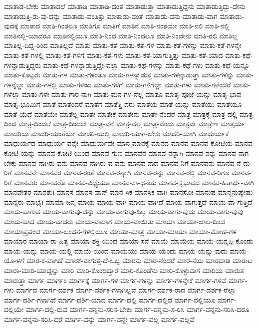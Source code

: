 {ಮಾತಾಡ-ಬೇಕು
ಮಾತಾಡಲೆ
ಮಾತಾಡಿ
ಮಾತಾಡಿ-ದಂತೆ
ಮಾತಾಡುತ್ತಾ
ಮಾತಾಡುತ್ತಿದ್ದನು
ಮಾತಾಡುತ್ತಿದ್ದು-ದೇನು
ಮಾತಾಡುತ್ತಿ-ರು-ವು-ದನ್ನು
ಮಾತಾಡು-ವಂತಿತ್ತು
ಮಾತಾಡು-ವಂತೆ
ಮಾತಾಡು-ವನು
ಮಾತಾಡು-ವಾಗ
ಮಾತಾಡು-ವುದಕ್ಕೆ
ಮಾತಾದ
ಮಾತಿ-ಗಿಂತಲೂ
ಮಾತಿಗೂ
ಮಾತಿಗೆ
ಮಾತಿನ
ಮಾತಿ-ನಂತೆಯೇ
ಮಾತಿ-ನಲಿ
ಮಾತಿ-ನಲ್ಲಿ
ಮಾತಿನಲ್ಲಿ-ಯಾದರೂ
ಮಾತಿನಲ್ಲಿಯೂ
ಮಾತಿ-ನಿಂದ
ಮಾತಿ-ನಿಂದಲೂ
ಮಾತಿ-ನಿಂದೇನು
ಮಾತಿ-ರಲಿ
ಮಾತಿಲ್ಲ
ಮಾತಿಲ್ಲ-ದಿದ್ದ-ರಿಂದ
ಮಾತಿಲ್ಲದೆ
ಮಾತು
ಮಾತು-ಕತೆ
ಮಾತು-ಕತೆ-ಗಳ
ಮಾತು-ಕತೆ-ಗಳನ್ನು
ಮಾತು-ಕತೆ-ಗಳನ್ನೇ
ಮಾತು-ಕತೆ-ಗಳಲ್ಲಿ
ಮಾತು-ಕತೆ-ಗಳಿಗೆ
ಮಾತು-ಕತೆ-ಗಳು
ಮಾತು-ಕತೆ-ಯಾಗುತ್ತಿತ್ತು
ಮಾತು-ಕತೆ-ಯಾದ
ಮಾತು-ಕಥೆ-ಗಳನ್ನಾಡುತ್ತಿದ್ದರು
ಮಾತು-ಕಥೆ-ಗಳನ್ನಾಡುತ್ತಿದ್ದೇ-ವಲ್ಲಾ
ಮಾತು-ಕಥೆ-ಗಳನ್ನು
ಮಾತು-ಕಥೆ-ಗಳು
ಮಾತು-ಕಥೆ-ಯನ್ನೂ
ಮಾತು-ಕೊಟ್ಟರು
ಮಾತು-ಗಳ
ಮಾತು-ಗಳಂತೂ
ಮಾತು-ಗಳನ್ನಾಡುತ್ತ
ಮಾತು-ಗಳನ್ನಾಡುತ್ತಾ
ಮಾತು-ಗಳನ್ನು
ಮಾತು-ಗಳನ್ನೆಲ್ಲಾ
ಮಾತು-ಗಳಲ್ಲಿ
ಮಾತು-ಗಳಿಂದ
ಮಾತು-ಗಳಿಗೆ
ಮಾತು-ಗಳಿಗೆಲ್ಲಾ
ಮಾತು-ಗಳು
ಮಾತು-ಗಳೆಂದರೆ
ಮಾತು-ಗಳೆಲ್ಲಾ
ಮಾತು-ಗಳೇ
ಮಾತು-ಗಾರ-ನಾಗಿ
ಮಾತು-ಮನ-ಗಳ-ನೆಲ್ಲ
ಮಾತೂ
ಮಾತೃ-ಪೂಜೆ-ಯನ್ನು
ಮಾತೃ-ಭಾವ
ಮಾತೃ-ಭೂಮಿಗೆ
ಮಾತೆ
ಮಾತೆಂದರೆ
ಮಾತೆಗೆ
ಮಾತೆತ್ತಿ-ದರು
ಮಾತೆಯ
ಮಾತೆ-ಯನ್ನು
ಮಾತೆಯು
ಮಾತೆಯೂ
ಮಾತೆ-ಯೆದೆ
ಮಾತೆಯೇ
ಮಾತೆಲ್ಲ
ಮಾತೇ
ಮಾತೇಕೆ
ಮಾತೇನು
ಮಾತೇ-ನೆಂದರೆ
ಮಾತ್ರ
ಮಾತ್ರಕ್ಕೆ
ಮಾತ್ರ-ದಲ್ಲಿ
ಮಾತ್ರ-ದಿಂದ
ಮಾತ್ರ-ದಿಂದಲೆ
ಮಾತ್ರ-ದಿಂದಲೇ
ಮಾತ್ರ-ವನೆ
ಮಾತ್ರ-ವಲ್ಲ
ಮಾತ್ರ-ವೆಂದು
ಮಾತ್ರವೇ
ಮಾತ್ರೇಣ
ಮಾತ್ಸರ್ಯ
ಮಾದರಿಯ
ಮಾದರಿ-ಯಂತೆಯೇ
ಮಾದರಿ-ಯಲ್ಲಿ
ಮಾದರಿ-ಯಾಗ-ಬೇಕು
ಮಾದರಿ-ಯಾಗಿ
ಮಾಧುರ್ಯಕೆ
ಮಾಧುರ್ಯದ
ಮಾಧುರ್ಯ-ವನ್ನೇ
ಮಾಧುರ್ಯವೇ
ಮಾನ
ಮಾನಕ್ಕೆ
ಮಾನದ
ಮಾನವ
ಮಾನವ-ಕೋಟಿಯ
ಮಾನವ-ಕೋಟಿ-ಯನ್ನು
ಮಾನವ-ಕೋಟಿ-ಯಿಂದ
ಮಾನವ-ಗುಣ
ಮಾನವನ
ಮಾನವ-ನನ್ನಾಗಿ
ಮಾನವ-ನನ್ನು
ಮಾನವ-ನಾಗ-ಬೇಕು
ಮಾನವ-ನಾಗಿರು-ವನು
ಮಾನವ-ನಾಗಿರು-ವ-ವನು
ಮಾನವ-ನಾದ
ಮಾನವ-ನಿಗೆ
ಮಾನವನು
ಮಾನವ-ನೆ-ದು-ರಿಗೆ
ಮಾನವನೇ
ಮಾನವರ
ಮಾನವ-ರಂತೆ
ಮಾನವ-ರನ್ನಾಗಿ
ಮಾನವ-ರನ್ನು
ಮಾನವ-ರಲ್ಲಿ
ಮಾನವ-ರಿಗೂ
ಮಾನವ-ರಿಗೆ
ಮಾನವರು
ಮಾನವರೊ
ಮಾನವ-ವಿಧ್ಯೆಯೂ
ಮಾನವ-ಸಾ-ಧನೆಯ
ಮಾನವ-ಸ್ವಭಾವದ
ಮಾನವ-ಹಿತಾರ್ಥ-ವಾಗಿ
ಮಾನವೇತರ
ಮಾನಶುಃ
ಮಾನಸ
ಮಾನಸ-ವಾನ್
ಮಾನ-ಸಿಕ
ಮಾನಸಿಕ-ವಾಗಿ
ಮಾನಸೋ
ಮಾನುಷ
ಮಾನ್ಮನುಷ್ಯೇಷು
ಮಾನ್ಯರು
ಮಾಭೈಃ
ಮಾಮಾ-ಜನ್ಮ
ಮಾಯ
ಮಾಯ-ವಾಗಿ
ಮಾಯ-ವಾಗಿದೆ
ಮಾಯ-ವಾಗುತ್ತದೆ
ಮಾಯ-ವಾ-ಗುತ್ತಿದೆ
ಮಾಯ-ವಾಗುವ
ಮಾಯ-ವಾಗುವು-ದನ್ನು
ಮಾಯ-ವಾಗುವು-ದಿಲ್ಲ
ಮಾಯ-ವಾಗು-ವುದು
ಮಾಯ-ವಾಗು-ವುವು
ಮಾಯ-ವಾದ
ಮಾಯ-ವಾದರು
ಮಾಯ-ವಾದಾಗ
ಮಾಯ-ವಾಯಿತು
ಮಾಯಾ
ಮಾಯಾ-ಜಾಲ-ದಿಂದ
ಮಾಯಾಪ್ರಪಂಚ
ಮಾಯಾ-ಬಂಧನ-ಗಳಲ್ಲಿಯೂ
ಮಾಯಾ-ಮಾತ್ರ
ಮಾಯಾ-ಮಾಯಾ
ಮಾಯಾ-ಮೋಹ-ಗಳ
ಮಾಯಾರ
ಮಾಯಾ-ರಾ-ಹಿತ್ಯ
ಮಾಯಾ-ಶಕ್ತಿ-ಯಿಂದ
ಮಾಯಾ-ಸನೆ
ಮಾಯೆ
ಮಾಯೆಯ
ಮಾಯೆ-ಯನ್ನಪ್ಪಿ-ಕೊಂಡು
ಮಾಯೆ-ಯನ್ನು
ಮಾಯೆ-ಯಲ್ಲಿ
ಮಾಯೆ-ಯಿಂದ
ಮಾಯೆಯು
ಮಾಯೆ-ಯೆಂದು
ಮಾಯೆ-ಯೆನ್ನು-ವುದು
ಮಾಯೆ-ಯೊ-ಳಗೆ
ಮಾರ-ಕ-ವಾಗಿದೆ
ಮಾರಕ-ವಾಗುತ್ತ-ದೆ-ಒಬ್ಬ
ಮಾರನು
ಮಾರ-ನೆಂದರೆ
ಮಾರ-ನೆಯ
ಮಾರವಾಡಿ
ಮಾರಾಟ
ಮಾರಾ-ಮಾರಿ-ಯಾದ್ದನ್ನು
ಮಾರಿ
ಮಾರಿ-ಕೊಂಡಿದ್ದಾರೆ
ಮಾರಿ-ಕೊಂಡೆನು
ಮಾರಿ-ಕೊಳ್ಳುವಾಗ
ಮಾರಿಯ
ಮಾರುತ
ಮಾರುತ್ತಾ
ಮಾರ್ಗ
ಮಾರ್ಗಂ
ಮಾರ್ಗಕ್ಕೆ
ಮಾರ್ಗ-ಗಳ
ಮಾರ್ಗ-ಗಳನ್ನು
ಮಾರ್ಗ-ಗಳನ್ನೇಕೆ
ಮಾರ್ಗ-ಗಳಿವೆ
ಮಾರ್ಗ-ಗಳು
ಮಾರ್ಗದ
ಮಾರ್ಗ-ದರ್ಶಕ
ಮಾರ್ಗ-ದರ್ಶಕ-ಗಳಾಗಿಲ್ಲವೆ
ಮಾರ್ಗ-ದರ್ಶಕ-ರಾದ
ಮಾರ್ಗ-ದರ್ಶಕ-ರೆಲ್ಲಾ
ಮಾರ್ಗ-ದರ್ಶಿ-ಗಳಾಗಿವೆ
ಮಾರ್ಗ-ದರ್ಶಿ-ಯಾದ
ಮಾರ್ಗ-ದಲ್ಲಿ
ಮಾರ್ಗ-ದಲ್ಲಿದೆ
ಮಾರ್ಗ-ದಲ್ಲಿಯೂ
ಮಾರ್ಗ-ದಲ್ಲಿಯೇ
ಮಾರ್ಗ-ದಲ್ಲಿ-ರುವ
ಮಾರ್ಗ-ವನ್ನನು-ಸರಿಸ-ಬೇಕು
ಮಾರ್ಗ-ವನ್ನನು-ಸ-ರಿಸಿ
ಮಾರ್ಗ-ವನ್ನನು-ಸರಿಸಿ-ದರೂ
ಮಾರ್ಗ-ವನ್ನನು-ಸರಿಸಿ-ದರೆ
ಮಾರ್ಗ-ವನ್ನು
ಮಾರ್ಗ-ವನ್ನೇ
ಮಾರ್ಗ-ವಲ್ಲ
ಮಾರ್ಗ-ವಲ್ಲವೆ
}
